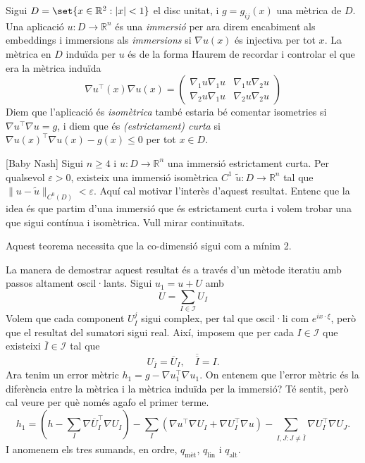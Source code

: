 Sigui $D=\set{x\in\mathbb R^2 : |x|<1}$ el disc unitat, i $g = g_{ij}(x)$ una mètrica de $D$. Una aplicació $u:D\to\mathbb R^n$ és una \textit{immersió} {\color{blue} per ara direm encabiment als embeddings i immersions als \textit{immersions}} si $\nabla u(x)$ és injectiva per tot $x$. La mètrica en $D$ induïda per $u$ és de la forma {\color{blue} Haurem de recordar i controlar el que era la mètrica induïda}
\begin{equation*}
    \nabla u ^{\intercal}(x)\nabla u (x) = \begin{pmatrix}
    \nabla_1 u\nabla_1 u & \nabla_1 u\nabla_2 u\\
    \nabla_2 u\nabla_1 u & \nabla_2 u\nabla_2 u
    \end{pmatrix}
\end{equation*}
Diem que l'aplicació és \textit{isomètrica} {\color{blue} també estaria bé comentar isometries} si $\nabla u ^{\intercal}\nabla u = g$, i diem que és \textit{(estrictament) curta} si $\nabla u(x)^{\intercal} \nabla u(x) - g(x) \le 0$ per tot $x\in D$.
\begin{teo}\label{Baby Nash} [Baby Nash]
    Sigui $n\ge 4$ i $u:D\to\mathbb R^n$ una immersió estrictament curta. Per qualsevol $\varepsilon > 0$, existeix una immersió isomètrica $C^1$ $\tilde u:D\to\mathbb R^n$ tal que $\|u-\tilde u\|_{C^0(D)} < \varepsilon$.{\color{blue} Aquí cal motivar l'interès d'aquest resultat. Entenc que la idea és que partim d'una immersió que és estrictament curta i volem trobar una que sigui contínua i isomètrica. Vull mirar continuïtats.}
\end{teo}
\begin{obs}
    Aquest teorema necessita que la co-dimensió sigui com a mínim 2.
\end{obs}
La manera de demostrar aquest resultat és a través d'un mètode iteratiu amb passos altament oscil·lants.
Sigui $u_1 = u + U$ amb 
\begin{equation*}
    U=\sum_{I\in\mathcal I} U_I
\end{equation*}
Volem que cada component $U_I^j$ sigui complex, per tal que oscil·li com $e^{ix \cdot \xi}$, però que el resultat del sumatori sigui real. Així, imposem que per cada $I\in\mathcal I$ que existeixi $\overline I\in\mathcal I$ tal que 
\begin{equation*}
    U_{\overline{I}} = \overline{U}_I, \quad \overline{\overline{I}} = I.
\end{equation*}
Ara tenim un error mètric $h_1 = g - \nabla u_1 ^{\intercal}\nabla u_1$. {\color{blue} On entenem que l'error mètric és la diferència entre la mètrica i la mètrica induïda per la immersió? Té sentit, però cal veure per què només agafo el primer terme.}
\begin{equation*}
    h_1 = 
        \left( h-\sum_{I} \nabla \overline{U}_I ^{\intercal}\nabla U_I \right) 
        - \sum_{I}\left( \nabla u ^{\intercal}\nabla U_I + \nabla U_I ^{\intercal}\nabla u \right)
        - \sum_{I,J: J\not = \overline I} \nabla U_I ^{\intercal}\nabla U_J.
\end{equation*}
I anomenem els tres sumands, en ordre, $q_{\text{mèt}}$, $q_{\text{lin}}$ i $q_{\text{alt}}$.

